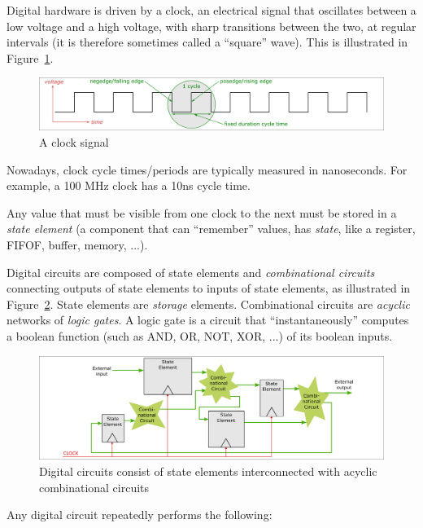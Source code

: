 Digital hardware is driven by a clock, an electrical signal that
oscillates between a low voltage and a high voltage, with sharp
transitions between the two, at regular intervals (it is therefore
sometimes called a ``square'' wave).  This is illustrated in
Figure~\ref{Fig_Clock_1}.

\begin{figure}[htbp]
  \centerline{\includegraphics[width=6in,angle=0]{Figures/Fig_Clock}}
  \caption{\label{Fig_Clock_1}A clock signal}
\end{figure}

Nowadays, clock cycle times/periods are typically measured in
nanoseconds. For example, a 100 MHz clock has a 10ns cycle time.

Any value that must be visible from one clock to the next must be
stored in a \emph{state element} (a component that can ``remember''
values, {\ie} has \emph{state}, like a register, FIFOF, buffer,
memory, ...).

Digital circuits are composed of state elements and
\emph{combinational circuits} connecting outputs of state elements to
inputs of state elements, as illustrated in
Figure~\ref{Fig_BSV_Digital_Circuits}.  State elements are
\emph{storage} elements.  Combinational circuits are \emph{acyclic}
networks of \emph{logic gates}.  A logic gate is a circuit that
``instantaneously'' computes a boolean function (such as AND, OR, NOT,
XOR, ...) of its boolean inputs.

\begin{figure}[htbp]
  \centerline{\includegraphics[width=6in,angle=0]{Figures/Fig_BSV_Digital_Circuits}}
  \caption{\label{Fig_BSV_Digital_Circuits}
           Digital circuits consist of state elements interconnected
	   with acyclic combinational circuits}
\end{figure}

Any digital circuit repeatedly performs the following:

